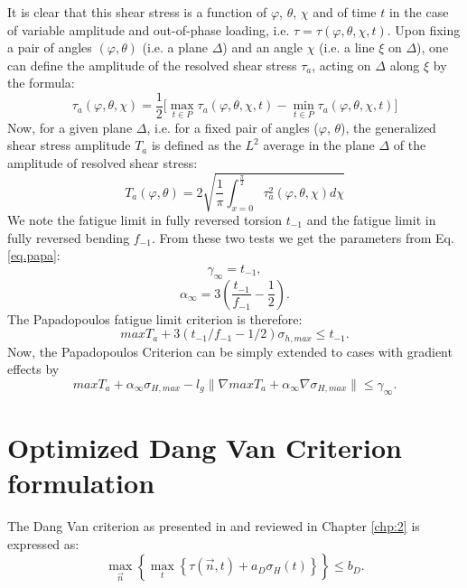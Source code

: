 It is clear that this shear stress is a function of
$\varphi$, $\theta$, $\chi$ and of time $t$ in the case of variable amplitude and out-of-phase loading, i.e. $\tau=\tau(\varphi, \theta, \chi, t)$. Upon fixing a pair of angles $(\varphi, \theta)$ (i.e. a plane
$\Delta$) and an angle $\chi$ (i.e. a line $\xi$ on $\Delta$), one can define the amplitude of the resolved shear stress $\tau_a$, acting on $\Delta$
along $\xi$ by the formula:
\begin{equation}
	\tau_a(\varphi,\theta,\chi)=\dfrac{1}{2}\big[\max \limits_{t\in P}\tau_a(\varphi,\theta,\chi ,t)-\min \limits_{t\in P}\tau_a(\varphi,\theta,\chi ,t)\big]
\end{equation}
Now, for a given plane $\Delta$, i.e. for a fixed pair of angles ($\varphi$, $\theta$),
the generalized shear stress amplitude $T_a$ is defined as the $L^2$ average in the plane $\Delta$ of the amplitude of resolved shear stress:
\begin{equation}
	T_a(\varphi,\theta)=2\sqrt{\dfrac{1}{\pi}\int_{x=0}^{\frac{\pi}{2}} \tau_a^2(\varphi,\theta,\chi)d\chi}
	\label{Ta}
\end{equation}
We note the fatigue limit in fully reversed torsion $t_{-1}$ and the fatigue limit in fully reversed bending $f_{-1}$. From these two tests we get the parameters from Eq.\ref{eq.papa}:
$$\gamma_\infty=t_{-1},$$ 
$$\alpha_\infty=3\left( \dfrac{t_{-1}}{f_{-1}}-\dfrac{1}{2}\right) .$$
The Papadopoulos fatigue limit criterion is therefore:
\begin{equation}
	maxT_a+3\left( t_{-1}/f_{-1}-1/2\right) \sigma_{h,max}\leqslant t_{-1}.
	\label{eq:papadopoulos}
\end{equation}
Now,  the Papadopoulos Criterion can be simply extended  to cases with gradient effects by
\begin{equation}
	maxT_a+\alpha_\infty\sigma_{H,max}-l_g\parallel\nabla{maxT_a}+\alpha_\infty\nabla\sigma_{H,max}\parallel\leqslant \gamma_\infty .
	\label{eq:modified papa}
\end{equation}

\section{Optimized Dang Van Criterion formulation}
The Dang Van criterion as presented in \cite{ballard1995high} and reviewed in Chapter \ref{chp:2} is expressed as:
\begin{equation}
	\max \limits_{\vec{n}}\left\lbrace \max \limits_{t}\left\{\tau{(\vec{n},t)}+a_D\sigma_H(t)\right\}\right\rbrace \leqslant b_D.
	\label{dv}
\end{equation}

